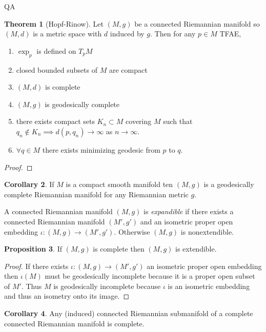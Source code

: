 QA	 \documentclass[12pt]{extarticle}
\theoremstyle{definition}
\newtheorem{theorem}{Theorem}[section]
\newtheorem{proposition}[theorem]{Proposition}
\newtheorem{corollary}[theorem]{Corollary}
\newenvironment{definition}[1][Definition:]{\begin{trivlist}
\item[\hskip \labelsep {\bfseries #1}]}{\end{trivlist}}
\begin{document}
\begin{theorem}[Hopf-Rinow]
Let $(M, g)$ be a connected Riemannian manifold so $(M, d)$ is a metric space with $d$ induced by $g$. Then for any $p \in M$ TFAE,
\begin{enumerate}
\item $\exp_p$  is defined on $T_p M$ 
\item closed bounded subsets of $M$ are compact
\item $(M, d)$ is complete
\item $(M, g)$ is geodesically  complete
\item there exists compact sets $K_n \subset M$ covering $M$ such that $q_n \notin K_n \implies d(p, q_n) \to \infty$ as $n \to \infty$.
\item $\forall q \in M$ there exists minimizing geodesic from $p$ to $q$.
\end{enumerate}
\end{theorem}

\begin{proof}

\end{proof}

\begin{corollary}
If $M$ is a compact smooth manifold ten $(M, g)$ is a geodesically complete Riemannian manifold for any Riemannian metric $g$. 
\end{corollary}

\begin{definition}
A connected Riemannian manifold $(M, g)$ is \textit{expandible} if there exists a connected Riemannian manifold $(M', g')$ and an isometric proper open embedding $\iota : (M, g) \to (M', g')$. Otherwise $(M, g)$ is nonextendible.  
\end{definition}

\begin{proposition}
If $(M, g)$ is complete then $(M, g)$ is extendible.
\end{proposition}

\begin{proof}
If there exists $\iota : (M, g) \to (M', g')$ an isometric proper open embedding then $\iota(M)$ must be geodesically incomplete because it is a proper open subset of $M'$. Thus $M$ is geodesically incomplete because $\iota$ is an isometric embedding and thus an isometry onto its image.
\end{proof}

\begin{corollary}
Any (induced) connected Riemannian submanifold of a complete connected Riemannian manifold is complete.
\end{corollary}
\end{document}
